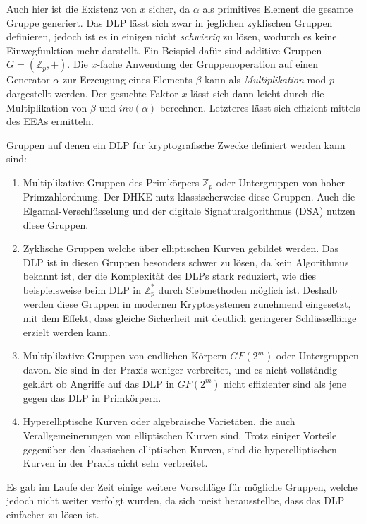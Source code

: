Auch hier ist die Existenz von $x$ sicher, da $\alpha$ als primitives Element die gesamte Gruppe generiert. Das DLP lässt sich zwar in jeglichen zyklischen Gruppen definieren, jedoch ist es in einigen nicht \textit{schwierig} zu lösen, wodurch es keine Einwegfunktion mehr darstellt. Ein Beispiel dafür sind additive Gruppen $G = (\mathbb{Z}_p, +)$. Die $x$-fache Anwendung der Gruppenoperation auf einen Generator $\alpha$ zur Erzeugung eines Elements $\beta$ kann als \textit{Multiplikation} mod $p$ dargestellt werden. Der gesuchte Faktor $x$ lässt sich dann leicht durch die Multiplikation von $\beta$ und $inv(\alpha)$ berechnen. Letzteres lässt sich effizient mittels des EEAs ermitteln.

Gruppen auf denen ein DLP für kryptografische Zwecke definiert werden kann sind:
\begin{enumerate}
\item Multiplikative Gruppen des Primkörpers $\mathbb{Z}_p$ oder Untergruppen von hoher Primzahlordnung. Der DHKE nutz klassischerweise diese Gruppen. Auch die Elgamal-Verschlüsselung und der digitale Signaturalgorithmus (DSA) nutzen diese Gruppen.

\item Zyklische Gruppen welche über elliptischen Kurven gebildet werden. Das DLP ist in diesen Gruppen besonders schwer zu lösen, da kein Algorithmus bekannt ist, der die Komplexität des DLPs stark reduziert, wie dies beispielsweise beim DLP in $\mathbb{Z}^*_p$ durch Siebmethoden möglich ist. Deshalb werden diese Gruppen in modernen Kryptosystemen zunehmend eingesetzt, mit dem Effekt, dass gleiche Sicherheit mit deutlich geringerer Schlüssellänge erzielt werden kann.

\item Multiplikative Gruppen von endlichen Körpern $GF(2^m)$ oder Untergruppen davon. Sie sind in der Praxis weniger verbreitet, und es nicht vollständig geklärt ob Angriffe auf das DLP in $GF(2^m)$ nicht effizienter sind als jene gegen das DLP in Primkörpern.

\item Hyperelliptische Kurven oder algebraische Varietäten, die auch Verallgemeinerungen von elliptischen Kurven sind. Trotz einiger Vorteile gegenüber den klassischen elliptischen Kurven, sind die hyperelliptischen Kurven in der Praxis nicht sehr verbreitet.
\end{enumerate}

Es gab im Laufe der Zeit einige weitere Vorschläge für mögliche Gruppen, welche jedoch nicht weiter verfolgt wurden, da sich meist herausstellte, dass das DLP einfacher zu lösen ist.\cite{Paar.2016}

